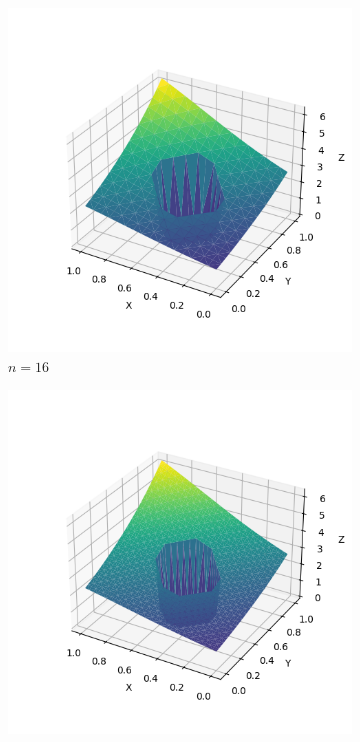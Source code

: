 \documentclass[lang=cn,a4paper,newtx,bibend=bibtex]{elegantpaper}
\begin{document}
\begin{figure}[H]
\begin{subfigure}[b]{0.18\textwidth}
      \includegraphics[width=\textwidth]{../../res_bac/res-[data|1-Dirichlet-irregular-b16].png}
      \caption{$n= 16$}
  \end{subfigure}
  \hfill
  \begin{subfigure}[b]{0.18\textwidth}
      \includegraphics[width=\textwidth]{../../res_bac/res-[data|1-Dirichlet-irregular-c32].png}

\end{subfigure}
\end{figure}
\end{document}
